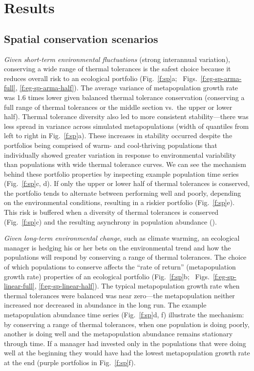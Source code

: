 \section{Results}

\subsection{Spatial conservation scenarios}\label{spatial-conservation-scenarios}

\emph{Given short-term environmental fluctuations} (strong interannual variation), conserving a wide range of thermal tolerances is the safest choice because it reduces overall risk to an ecological portfolio (Fig.~\ref{f:sp}a; \somts~Figs.~\ref{f:eg-sp-arma-full}, \ref{f:eg-sp-arma-half}). The average variance of metapopulation growth rate was 1.6 times lower given balanced thermal tolerance conservation (conserving a full range of thermal tolerances or the middle section vs.~the upper or lower half). Thermal tolerance diversity also led to more consistent stability---there was less spread in variance across simulated metapopulations (width of quantiles from left to right in Fig.~\ref{f:sp}a). These increases in stability occurred despite the portfolios being comprised of warm- and cool-thriving populations that individually showed greater variation in response to environmental variability than populations with wide thermal tolerance curves. We can see the mechanism behind these portfolio properties by inspecting example population time series (Fig.~\ref{f:sp}c, d). If only the upper or lower half of thermal tolerances is conserved, the portfolio tends to alternate between performing well and poorly, depending on the environmental conditions, resulting in a riskier portfolio (Fig.~\ref{f:sp}e). This risk is buffered when a diversity of thermal tolerances is conserved (Fig.~\ref{f:sp}c) and the resulting asynchrony in population abundance (\somcor).

\emph{Given long-term environmental change}, such as climate warming, an ecological manager is hedging his or her bets on the environmental trend and how the populations will respond by conserving a range of thermal tolerances. The choice of which populations to conserve affects the ``rate of return'' (metapopulation growth rate) properties of an ecological portfolio (Fig.~\ref{f:sp}b; \somts~Figs.~\ref{f:eg-sp-linear-full}, \ref{f:eg-sp-linear-half}). The typical metapopulation growth rate when thermal tolerances were balanced was near zero---the metapopulation neither increased nor decreased in abundance in the long run. The example metapopulation abundance time series (Fig.~\ref{f:sp}d, f) illustrate the mechanism: by conserving a range of thermal tolerances, when one population is doing poorly, another is doing well and the metapopulation abundance remains stationary through time. If a manager had invested only in the populations that were doing well at the beginning they would have had the lowest metapopulation growth rate at the end (purple portfolios in Fig.~\ref{f:sp}f).

